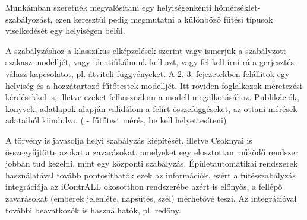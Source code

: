 


Munkámban szeretnék megvalósítani egy helyiségenkénti hőmérséklet-szabályozást, ezen keresztül pedig megmutatni a különböző fűtési típusok viselkedését egy helyiségen belül.
\vspace{18pt}

\pagebreak

A szabályzáshoz a klasszikus elképzelések szerint vagy ismerjük a szabályzott szakasz modelljét, vagy identifikálnunk kell azt, vagy fel kell írni rá a gerjesztés-válasz kapcsolatot, pl. átviteli függvényeket. 
%
A 2.-3. fejezetekben felállítok egy helyiség és a hozzátartozó fűtőtestek modelljét. Itt röviden foglalkozok méretezési kérdésekkel is, illetve ezeket felhasználom a modell megalkotásához. Publikációk, könyvek, adatlapok alapján validálom a felírt összefüggéseket, az ottani mérések adataiból kiindulva. (\cite[313.~o.]{Herz} - fűtőtest mérés, be kell helyettesíteni)


A törvény is javasolja helyi szabályzás kiépítését, illetve Csoknyai \cite[118.~o.]{Herz} is összegyűjtötte azokat a zavarásokat, amelyeket egy elosztottan működő rendszer jobban tud kezelni, mint egy központi szabályzás. Épületautomatikai rendszerek használatával tovább pontosíthatók ezek az információk, ezért a fűtésszabályzás integrációja az iContrALL okosotthon rendszerébe azért is előnyös, a fellépő zavarásokat (emberek jelenléte, napsütés, szél) mérhetővé teszi. Az integrációval további beavatkozók is használhatók, pl. redőny. %

